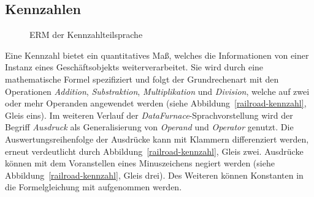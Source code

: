 \documentclass[
  language=german, %
  type=bachelor,%
  ngerman
]{isthesis}
\begin{document}
\begin{content}
  \subsection{Kennzahlen}

  \begin{figure}
    \resizebox{250px}{!}{}
    \caption{\acrshort{ERM} der Kennzahlteilsprache}\label{kennzahl}
  \end{figure}

	Eine Kennzahl bietet ein quantitatives Maß, welches die Informationen von
	einer Instanz eines Geschäftsobjekts weiterverarbeitet. Sie
	wird durch eine mathematische Formel spezifiziert und folgt der
	Grundrechenart mit den Operationen \textit{Addition}, \textit{Substraktion},
	\textit{Multiplikation} und \textit{Division}, welche auf zwei oder mehr
	Operanden angewendet werden (siehe Abbildung~\ref{railroad-kennzahl}, Gleis
	eins). Im weiteren Verlauf der \textit{DataFurnace}-Sprachvorstellung wird
	der Begriff \textit{Ausdruck} als Generalisierung von \textit{Operand} und
	\textit{Operator} genutzt.  Die Auswertungsreihenfolge der Ausdrücke kann mit
	Klammern differenziert werden, erneut verdeutlicht durch
	Abbildung~\ref{railroad-kennzahl}, Gleis zwei.  Ausdrücke können mit dem
	Voranstellen eines Minuszeichens negiert werden (siehe
	Abbildung~\ref{railroad-kennzahl}, Gleis drei). Des Weiteren können
	Konstanten in die Formelgleichung mit aufgenommen werden.



\end{content}
\end{document}
